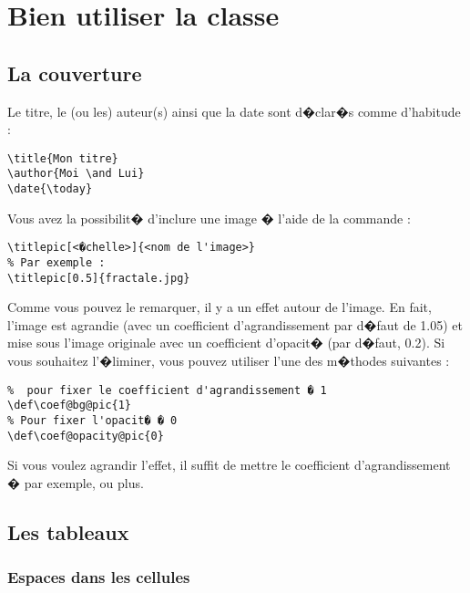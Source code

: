 \documentclass[ams,openany,10pt,presentation,latin1]{mathbook}
\begin{document}
\chapter{Bien utiliser la classe}

\section{La couverture}

Le titre, le (ou les) auteur(s) ainsi que la date sont d�clar�s comme d'habitude :

\medskip

\begin{lstlisting}
\title{Mon titre}
\author{Moi \and Lui}
\date{\today}
\end{lstlisting}

\medskip

Vous avez la possibilit� d'inclure une image � l'aide de la commande :

\medskip

\begin{lstlisting}
\titlepic[<�chelle>]{<nom de l'image>}
% Par exemple :
\titlepic[0.5]{fractale.jpg}
\end{lstlisting}

\medskip

Comme vous pouvez le remarquer, il y a un effet autour de l'image.  En fait, l'image est agrandie (avec un coefficient d'agrandissement par d�faut de 1.05) et mise sous l'image originale avec un coefficient d'opacit� (par d�faut, 0.2). Si vous souhaitez l'�liminer, vous pouvez utiliser l'une des m�thodes suivantes :

\medskip

\begin{lstlisting}
%  pour fixer le coefficient d'agrandissement � 1
\def\coef@bg@pic{1}
% Pour fixer l'opacit� � 0
\def\coef@opacity@pic{0}
\end{lstlisting}

\medskip

Si vous voulez agrandir l'effet, il suffit de mettre le coefficient d'agrandissement �  \fg{} par exemple, ou plus.

\section{Les tableaux}

\subsection{Espaces dans les cellules}
\end{document}
